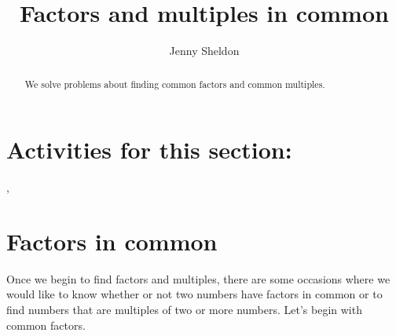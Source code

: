 \documentclass{ximera}
\title{Factors and multiples in common}
\author{Jenny Sheldon}
\begin{document}
\begin{abstract}
We solve problems about finding common factors and common multiples.
\end{abstract}
\maketitle

\section{Activities for this section:} 
, 

\section{Factors in common}

Once we begin to find factors and multiples, there are some occasions where we would like to know whether or not two numbers have factors in common or to find numbers that are multiples of two or more numbers. Let's begin with common factors.
\end{document}
